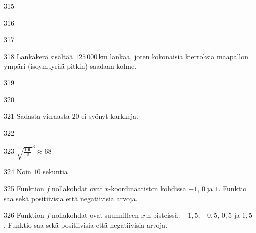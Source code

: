 \begin{Vastaus}{315}
	
\end{Vastaus}
\begin{Vastaus}{316}
	
\end{Vastaus}
\begin{Vastaus}{317}
	
\end{Vastaus}
\begin{Vastaus}{318}
Lankakerä sisältää $125\,000$\,km lankaa, joten kokonaisia kierroksia maapallon ympäri (isoympyrää pitkin) saadaan kolme.
	
\end{Vastaus}
\begin{Vastaus}{319}
	
\end{Vastaus}
\begin{Vastaus}{320}
	
\end{Vastaus}
\begin{Vastaus}{321}
		Sadasta vieraasta $20$ ei syönyt karkkeja.
	
\end{Vastaus}
\begin{Vastaus}{322}
	
\end{Vastaus}
\begin{Vastaus}{323}
		${\sqrt{\frac{100}{6}}}^{3} \approx 68$
	
\end{Vastaus}
\begin{Vastaus}{324}
        Noin $10$ sekuntia
    
\end{Vastaus}
\begin{Vastaus}{325}
Funktion $f$ nollakohdat ovat $x$-koordinaatiston kohdissa $-1$, $0$ ja $1$. Funktio saa sekä positiivisia että negatiivisia arvoja.
\end{Vastaus}
\begin{Vastaus}{326}
Funktion $f$ nollakohdat ovat suunnilleen $x$:n pisteissä: $-1,5$, $-0,5$, $0,5$ ja $1,5$. Funktio saa sekä positiivisia että negatiivisia arvoja.
	
\end{Vastaus}
